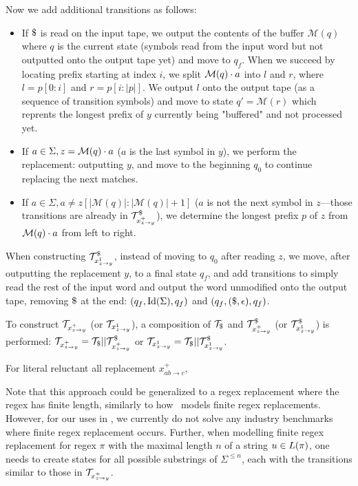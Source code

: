 Now we add additional transitions as follows:\newline
\begin{itemize}
  \item If $\marker$ is read on the input tape, we output the contents of the buffer $\mathcal{M}(q)$ where $q$ is the current state (symbols read from the input word but not outputted onto the output tape yet) and move to $q_f$.
  When we succeed by locating prefix starting at index $i$, we split $\mathcal{M}(q) \cdot a$ into $l$ and $r$, where $l = p[0:i]$ and $r = p[i:|p|]$.
  We output $l$ onto the output tape (as a sequence of transition symbols) and move to state $q' = \mathcal{M}(r)$ which reprents the longest prefix of $y$ currently being "buffered" and not processed yet.
  \item If $a \in \Sigma, z = \mathcal{M}(q)\cdot a$ ($a$ is the last symbol in $y$), we perform the replacement: outputting $y$, and move to the beginning $q_0$ to continue replacing the next matches.
  \item If $a \in \Sigma, a \neq z[|\mathcal{M}(q)|:|\mathcal{M}(q)| + 1]$ ($a$ is not the next symbol in $z$---those transitions are already in  $\mathcal{T}^\$_{x^{+}_{z \rightarrow y}}$), we determine the longest prefix $p$ of $z$ from $\mathcal{M}(q) \cdot a$ from left to right.
\end{itemize}

When constructing $\mathcal{T}^\$_{x^{1}_{z \rightarrow y}}$, instead of moving to $q_0$ after reading $z$, we move, after outputting the replacement $y$, to a final state $q_f$, and add transitions to simply read the rest of the input word and output the word unmodified onto the output tape, removing $\marker$ at the end: $(q_f, \text{Id}(\Sigma), q_f)$ and $(q_f, (\$, \epsilon), q_f)$.

To construct $\mathcal{T}_{x^{+}_{z \rightarrow y}}$ (or $\mathcal{T}_{x^{1}_{z \rightarrow y}}$), a composition of $\ft_\marker$ and $\mathcal{T}^\$_{x^{+}_{z \rightarrow y}}$ (or $\mathcal{T}^\$_{x^{1}_{z \rightarrow y}}$) is performed: $\mathcal{T}_{x^{+}_{z \rightarrow y}} = \mathcal{T}_\$ || \mathcal{T}^\$_{x^{+}_{z \rightarrow y}}$ or $\mathcal{T}_{x^{1}_{z \rightarrow y}} = \mathcal{T}_\$ || \mathcal{T}^\$_{x^{1}_{z \rightarrow y}}$.

\begin{example}
  For literal reluctant all replacement $x^{+}_{ab \rightarrow c}$,
\end{example}

Note that this approach could be generalized to a regex replacement where the regex has finite length, similarly to how~\cite{replace_nfts_model_ModelingRegularReplacementForStringConstraintSolving_DBLP:conf/nfm/FuL10} models finite regex replacements.
However, for our uses in \noodler, we currently do not solve any industry benchmarks where finite regex replacement occurs.
Further, when modelling finite regex replacement for regex $\pi$ with the maximal length $n$ of a string $u \in L(\pi)$, one needs to create states for all possible substrings of $\Sigma^{\leq n}$, each with the transitions similar to those in $\mathcal{T}_{x^{+}_{z \rightarrow y}}$.

